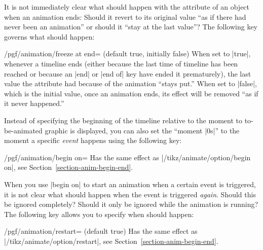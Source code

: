 It is not immediately clear what should happen with the attribute of
an object when an animation ends: Should it revert to its original
value ``as if there had never been an animation'' or should it ``stay
at the last value''? The following key governs what should happen:

\begin{key}{/pgf/animation/freeze at end= (default
  true, initially false)}
  When set to |true|, whenever a timeline ends (either because the
  last time of timeline has been reached or because an |end| or
  |end of| key have ended it prematurely), the last value the
  attribute had because of the animation ``stays put.'' When set to
  |false|, which is the initial value, once an animation ends, its
  effect will be removed ``as if it never happened.''
\begin{codeexample}[animation list={0,1,2,3,4}]
\end{codeexample}
\begin{codeexample}[animation list={0,1,2,3,4}]
\end{codeexample}
\end{key}

Instead of specifying the beginning of the timeline relative to the
moment to to-be-animated graphic is displayed, you can also set the
``moment |0s|'' to the moment a specific \emph{event} happens using
the following key:

\begin{key}{/pgf/animation/begin on=}
  Has the same effect as |/tikz/animate/option/begin on|, see
  Section~\ref{section-anim-begin-end}.
\end{key}

When you use |begin on| to start an animation when a certain event is
triggered, it is not clear what should happen when the event is
triggered \emph{again}. Should this be ignored completely? Should it
only be ignored while the animation is running? The following key
allows you to specify when should happen:

\begin{key}{/pgf/animation/restart= (default true)}
  Has the same effect as |/tikz/animate/option/restart|, see
  Section~\ref{section-anim-begin-end}.
\end{key}

